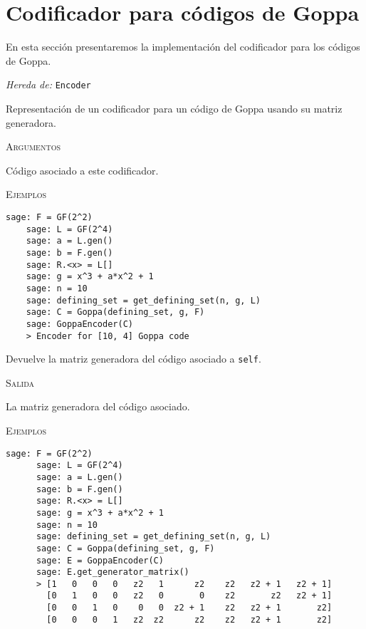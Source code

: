 \section{Codificador para códigos de Goppa}

En esta sección presentaremos la implementación del codificador para los códigos de Goppa.

\begin{description}[leftmargin=1em, font=\normalfont\ttfamily, style=nextline]
\item[class GoppaEncoder(self, code)]

\emph{Hereda de:} \texttt{Encoder}

Representación de un codificador para un código de Goppa usando su matriz generadora.

\textsc{Argumentos}
\begin{description}[font=\normalfont\ttfamily]
  \item[code] Código asociado a este codificador.
\end{description}

\textsc{Ejemplos}
  \begin{lstlisting}[gobble=4]
    sage: F = GF(2^2)
    sage: L = GF(2^4)
    sage: a = L.gen()
    sage: b = F.gen()
    sage: R.<x> = L[]
    sage: g = x^3 + a*x^2 + 1
    sage: n = 10
    sage: defining_set = get_defining_set(n, g, L)
    sage: C = Goppa(defining_set, g, F)
    sage: GoppaEncoder(C)
    > Encoder for [10, 4] Goppa code
  \end{lstlisting}

  \begin{description}[font=\ttfamily, style=nextline]
    \item[get\_generator\_matrix(self)] Devuelve la matriz generadora del código asociado a \texttt{self}.
    
    \textsc{Salida}
    \begin{description}[font=\normalfont\ttfamily]
      \item[] La matriz generadora del código asociado.
    \end{description}

    \textsc{Ejemplos}
    \begin{lstlisting}[gobble=4]
      sage: F = GF(2^2)
      sage: L = GF(2^4)
      sage: a = L.gen()
      sage: b = F.gen()
      sage: R.<x> = L[]
      sage: g = x^3 + a*x^2 + 1
      sage: n = 10
      sage: defining_set = get_defining_set(n, g, L)
      sage: C = Goppa(defining_set, g, F)
      sage: E = GoppaEncoder(C)
      sage: E.get_generator_matrix()
      > [1   0   0   0   z2   1      z2    z2   z2 + 1   z2 + 1]
        [0   1   0   0   z2   0       0    z2       z2   z2 + 1]
        [0   0   1   0    0   0  z2 + 1    z2   z2 + 1       z2]
        [0   0   0   1   z2  z2      z2    z2   z2 + 1       z2]
    \end{lstlisting}


\end{description}
\end{description}
